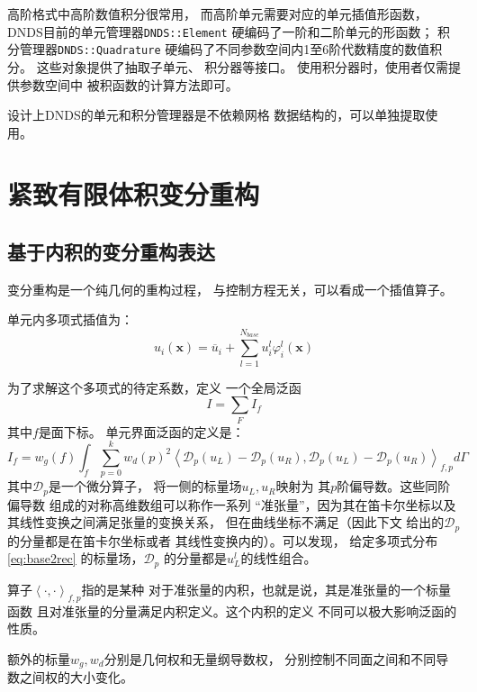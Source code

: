 \documentclass[UTF8,zihao=5]{ctexart} %
\newcommand*{\mean}[1]{{#1}}
\begin{document}
高阶格式中高阶数值积分很常用，
而高阶单元需要对应的单元插值形函数，
DNDS目前的单元管理器\verb|DNDS::Element|
硬编码了一阶和二阶单元的形函数；
积分管理器\verb|DNDS::Quadrature|
硬编码了不同参数空间内1至6阶代数精度的数值积分。
这些对象提供了抽取子单元、
积分器等接口。
使用积分器时，使用者仅需提供参数空间中
被积函数的计算方法即可。

设计上DNDS的单元和积分管理器是不依赖网格
数据结构的，可以单独提取使用。


\section{紧致有限体积变分重构}


\subsection{基于内积的变分重构表达}
\renewcommand*{\mean}[1]
{\overline{#1}}
\newcommand*{\x}[0]
{\symbf{x}}
\newcommand*{\D}[0]
{\mathcal{D}}
\newcommand*{\inner}[1]
{\left\langle#1\right\rangle}

变分重构是一个纯几何的重构过程，
与控制方程无关，可以看成一个插值算子。

单元内多项式插值为：
\begin{equation}
    \label{eq:base2rec}
    u_i(\x)=\mean{u}_i + \sum_{l=1}^{N_{base}}{u_i^l\varphi_i^l(\x)}
\end{equation}

为了求解这个多项式的待定系数，定义
一个全局泛函
\begin{equation}
    I=\sum_{F}{I_f}
\end{equation}
其中$f$是面下标。
单元界面泛函的定义是：
\begin{equation}\label{eq:IJI}
    I_f = w_g(f) \int_f{\sum_{p=0}^k{
    w_d(p)^2 \inner{\D_p(u_L)-\D_p(u_R),\D_p(u_L)-\D_p(u_R)}_{f,p}
    } d\Gamma}
\end{equation}
其中$\D_p$是一个微分算子，
将一侧的标量场$u_L, u_R$映射为
其$p$阶偏导数。这些同阶偏导数
组成的对称高维数组可以称作一系列
“准张量”，因为其在笛卡尔坐标以及
其线性变换之间满足张量的变换关系，
但在曲线坐标不满足（因此下文
给出的$\D_p$的分量都是在笛卡尔坐标或者
其线性变换内的）。可以发现，
给定多项式分布\eqref{eq:base2rec}
的标量场，$\D_p$
的分量都是$u^l_L$的线性组合。

算子$\inner{\cdot,\cdot}_{f,p}$指的是某种
对于准张量的内积，也就是说，其是准张量的一个标量函数
且对准张量的分量满足内积定义。这个内积的定义
不同可以极大影响泛函的性质。

额外的标量$w_g,w_d$分别是几何权和无量纲导数权，
分别控制不同面之间和不同导数之间权的大小变化。
\end{document}
